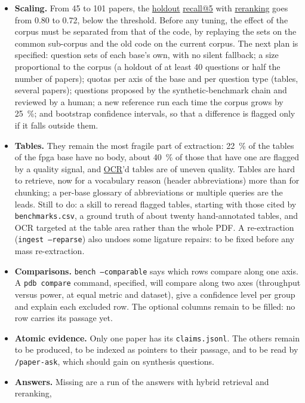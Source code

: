\documentclass[11pt,a4paper]{article}
\newcommand{\cmd}[1]{\texttt{#1}}
\newcommand{\gl}[2]{\hyperlink{gl:#1}{\textcolor{glcolor}{#2}}}
\begin{document}
\begin{itemize}
  \item \textbf{Scaling.} From 45 to 101 papers, the \gl{holdout}{holdout} \gl{recall}{recall@5} with \gl{reranking}{reranking}
    goes from 0.80 to 0.72, below the threshold. Before any tuning, the effect of the corpus
    must be separated from that of the code, by replaying the sets on the common sub-corpus
    and the old code on the current corpus. The next plan is specified: question sets of each
    base's own, with no silent fallback; a size proportional to the corpus (a holdout of at
    least 40 questions or half the number of papers); quotas per axis of the base and per
    question type (tables, several papers); questions proposed by the synthetic-benchmark
    chain and reviewed by a human; a new reference run each time the corpus grows by 25~\%;
    and bootstrap confidence intervals, so that a difference is flagged only if it falls
    outside them.
  \item \textbf{Tables.} They remain the most fragile part of extraction: 22~\% of the tables
    of the fpga base have no body, about 40~\% of those that have one are flagged by a quality
    signal, and \gl{OCR}{OCR}'d tables are of uneven quality. Tables are hard to retrieve, now for a
    vocabulary reason (header abbreviations) more than for chunking; a per-base glossary of
    abbreviations or multiple queries are the leads. Still to do: a skill to reread flagged
    tables, starting with those cited by \cmd{benchmarks.csv}, a ground truth of about twenty
    hand-annotated tables, and OCR targeted at the table area rather than the whole PDF. A
    re-extraction (\cmd{ingest --reparse}) also undoes some ligature repairs: to be fixed
    before any mass re-extraction.
  \item \textbf{Comparisons.} \cmd{bench --comparable} says which rows compare along one axis.
    A \cmd{pdb compare} command, specified, will compare along two axes (throughput versus
    power, at equal metric and dataset), give a confidence level per group and explain each
    excluded row. The optional columns remain to be filled: no row carries its passage yet.
  \item \textbf{Atomic evidence.} Only one paper has its \cmd{claims.jsonl}. The others remain
    to be produced, to be indexed as pointers to their passage, and to be read by
    \cmd{/paper-ask}, which should gain on synthesis questions.
  \item \textbf{Answers.} Missing are a run of the answers with hybrid retrieval and reranking,

\end{itemize}
\end{document}

